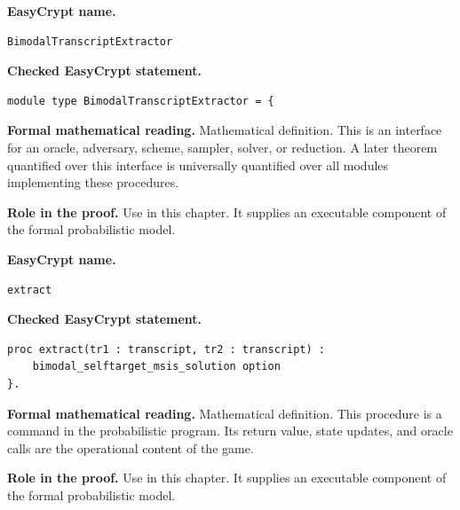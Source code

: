 \begin{formaldefinition}
\noindent\textbf{EasyCrypt name.}
\begin{lstlisting}[language=EasyCrypt,basicstyle=\ttfamily\scriptsize]
BimodalTranscriptExtractor
\end{lstlisting}
\noindent\textbf{Checked EasyCrypt statement.}
\begin{lstlisting}[language=EasyCrypt,basicstyle=\ttfamily\scriptsize]
module type BimodalTranscriptExtractor = {
\end{lstlisting}
\noindent\textbf{Formal mathematical reading.}
Mathematical definition. This is an interface for an oracle, adversary, scheme, sampler, solver, or reduction.  A later theorem quantified over this interface is universally quantified over all modules implementing these procedures.

\noindent\textbf{Role in the proof.}
Use in this chapter. It supplies an executable component of the formal probabilistic model.

\end{formaldefinition}

\begin{formaldefinition}
\noindent\textbf{EasyCrypt name.}
\begin{lstlisting}[language=EasyCrypt,basicstyle=\ttfamily\scriptsize]
extract
\end{lstlisting}
\noindent\textbf{Checked EasyCrypt statement.}
\begin{lstlisting}[language=EasyCrypt,basicstyle=\ttfamily\scriptsize]
proc extract(tr1 : transcript, tr2 : transcript) :
    bimodal_selftarget_msis_solution option
}.
\end{lstlisting}
\noindent\textbf{Formal mathematical reading.}
Mathematical definition. This procedure is a command in the probabilistic program.  Its return value, state updates, and oracle calls are the operational content of the game.

\noindent\textbf{Role in the proof.}
Use in this chapter. It supplies an executable component of the formal probabilistic model.

\end{formaldefinition}

